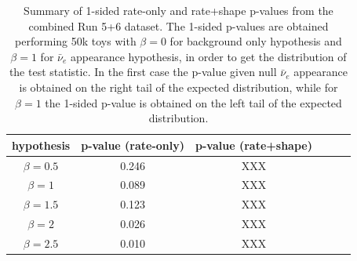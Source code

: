 %
%
\begin{table}[htb]
\centering
\begin{tabular}{| c | c | c | c | c | c |}
\hline
hypothesis		 		& p-value (rate-only)	  	& p-value (rate+shape)  	\\
\hline
$\beta=0.5$			  	& 0.246 			 	& XXX			  	\\
\hline
$\beta=1$			 		& 0.089 			 	& XXX			  	\\
\hline
$\beta=1.5$				& 0.123 			 	& XXX			  	\\
\hline
$\beta=2$			 		& 0.026 			 	& XXX			  	\\
\hline
$\beta=2.5$		 		& 0.010 			 	& XXX			  	\\

\hline
\end{tabular}
\caption{
Summary of 1-sided rate-only and rate+shape p-values from the combined Run 5+6 dataset.
The 1-sided p-values are obtained performing 50k toys with $\beta=0$ for background only hypothesis
and $\beta=1$ for $\bar{\nu}_e$ appearance hypothesis, in order to get the distribution of the test statistic.
In the first case the p-value given null $\bar{\nu}_e$ appearance is obtained on the right tail of the expected distribution,
while for $\beta=1$ the 1-sided p-value is obtained on the left tail of the expected distribution.
}
\label{tab:results_bkg}
\end{table}





\clearpage
